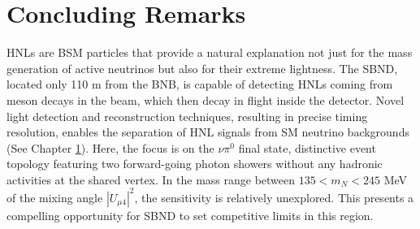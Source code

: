 \section{Concluding Remarks}

HNLs are BSM particles that provide a natural explanation not just for the mass generation of active neutrinos but also for their extreme lightness.
The SBND, located only 110 m from the BNB, is capable of detecting HNLs coming from meson decays in the beam, which then decay in flight inside the detector.
Novel light detection and reconstruction techniques, resulting in precise timing resolution, enables the separation of HNL signals from SM neutrino backgrounds (See Chapter \ref{}).
Here, the focus is on the $\nu\pi^{0}$ final state, distinctive event topology featuring two forward-going photon showers without any hadronic activities at the shared vertex.
In the mass range between $135 < m_{N} < 245$ MeV of the mixing angle $|U_{\mu4}|^{2}$, the sensitivity is relatively unexplored.
This presents a compelling opportunity for SBND to set competitive limits in this region.
